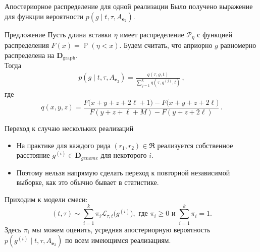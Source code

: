 \documentclass[unicode, notheorems]{beamer}
\DeclareMathOperator{\Prb}{\mathbb{P}}
\begin{document}
\begin{frame}{Апостериорное распределение для одной реализации}
Было получено выражение для функции вероятности $p(g \mid t, \tau, A_{\mathbf{e}_2})$.
\begin{block}{Предложение}
	Пусть длина вставки $\eta$ имеет распределение $\mathcal{P}_\eta$ с функцией распределения $F(x) = \Prb(\eta < x)$. Будем считать, что априорно $g$ равномерно распределена на $\mathbf{D}_{\mathrm{graph}}$.\\
	\medskip
	Тогда
	\begin{equation*}
	\begin{gathered}
	p(g \mid t, \tau,  A_{\mathbf{e}_2}) =  \frac{q(\tau, g, t)}{\sum_{j=1}^k q(\tau, g^{(j)}, t)}	\,,
	\end{gathered}
	\end{equation*}
	где
	\begin{equation*}
		q(x, y, z)  = \frac{F\big(x+y+z+2\ell+1\big) - F\big(x+y+z+2\ell\big)}{F( y + z + \ell + M) - F(y + z + 2\ell)}\,.
	\end{equation*}
\end{block}
\end{frame}

\begin{frame}{Переход к случаю нескольких реализаций}
	\begin{itemize}
		\item На практике для каждого рида  $(r_1, r_2) \in \mathfrak{R}$ реализуется собственное расстояние $g^{(i)} \in \mathbf{D}_{genome}$ для некоторого $i$.
		\item Поэтому нельзя напрямую сделать переход к повторной независимой выборке, как это обычно бывает в статистике.
	\end{itemize}
	\medskip
	Приходим к {\color{blue} модели смеси}:
	\begin{equation*}
		(t, \tau) \sim \sum_{i=1}^k \pi_i  \mathcal{L}_{\tau, t} \big(g^{(i)}\big), \text{ где } \pi_i \ge 0 \text{ и } \sum_{i=1}^k \pi_i = 1.
	\end{equation*}
	Здесь $\pi_i$ мы можем оценить, усредняя апостериорную вероятность $p(g^{(i)} \mid t, \tau, A_{\mathbf{e}_2})$ по всем имеющимся реализациям.
\end{frame}
\end{document}
